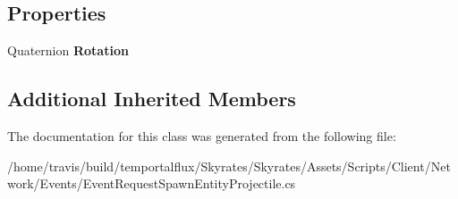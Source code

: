 \subsection*{Properties}
\begin{DoxyCompactItemize}
\item 
\hypertarget{class_skyrates_1_1_client_1_1_network_1_1_event_1_1_event_request_spawn_entity_projectile_a3790f220495dc59e2d11e3c1ff7c57b5}{Quaternion {\bfseries Rotation}}\label{class_skyrates_1_1_client_1_1_network_1_1_event_1_1_event_request_spawn_entity_projectile_a3790f220495dc59e2d11e3c1ff7c57b5}

\end{DoxyCompactItemize}
\subsection*{Additional Inherited Members}


The documentation for this class was generated from the following file\-:\begin{DoxyCompactItemize}
\item 
/home/travis/build/temportalflux/\-Skyrates/\-Skyrates/\-Assets/\-Scripts/\-Client/\-Network/\-Events/Event\-Request\-Spawn\-Entity\-Projectile.\-cs\end{DoxyCompactItemize}
